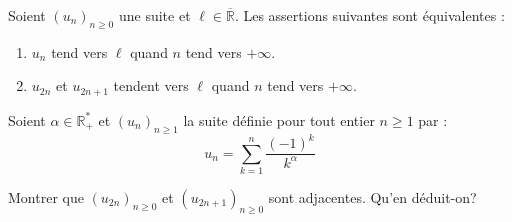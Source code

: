 \documentclass[french,11pt,twoside]{VcCours}
\begin{document}
\begin{Proposition}{} Soient $(u_n)_{n \geq 0}$ une suite et $\ell \in \overline{\mathbb{R}}$. Les assertions suivantes sont équivalentes :

\begin{enumerate}
\item $u_n$ tend vers $\ell$ quand $n$ tend vers $+ \infty$.
\item $u_{2n}$ et $u_{2n+1}$ tendent vers $\ell$ quand $n$ tend vers $+ \infty$.
\end{enumerate}
\end{Proposition}

\begin{Exemple} Soient $\alpha \in \mathbb{R}_+^*$ et $(u_n)_{n \geq 1}$ la suite définie pour tout entier $n \geq 1$ par :
$$ u_n = \sum_{k=1}^n \frac{(-1)^k}{k^{\alpha}}$$

\medskip

Montrer que $(u_{2n})_{n \geq 0}$ et $(u_{2n+1})_{n \geq 0}$ sont adjacentes. Qu'en déduit-on?
%
%
%
\newpage
\end{Exemple}
\end{document}
